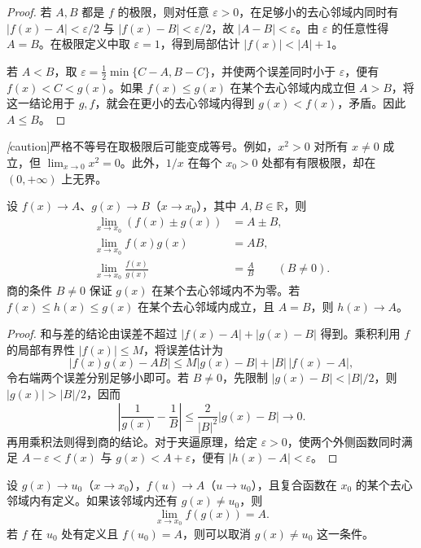 \documentclass[UTF8,12pt,a4paper,fontset=fandol]{ctexbook}
\begin{document}
\begin{proof}
若 $A,B$ 都是 $f$ 的极限，则对任意 $\varepsilon>0$，在足够小的去心邻域内同时有 $|f(x)-A|<\varepsilon/2$ 与 $|f(x)-B|<\varepsilon/2$，故 $|A-B|<\varepsilon$。由 $\varepsilon$ 的任意性得 $A=B$。在极限定义中取 $\varepsilon=1$，得到局部估计 $|f(x)|<|A|+1$。

若 $A<B$，取 $\varepsilon=\tfrac12\min\{C-A,B-C\}$，并使两个误差同时小于 $\varepsilon$，便有 $f(x)<C<g(x)$。如果 $f(x)\leq g(x)$ 在某个去心邻域内成立但 $A>B$，将这一结论用于 $g,f$，就会在更小的去心邻域内得到 $g(x)<f(x)$，矛盾。因此 $A\leq B$。
\end{proof}

\emph[caution]{严格不等号在取极限后可能变成等号。}例如，$x^2>0$ 对所有 $x\neq0$ 成立，但 $\lim_{x\to0}x^2=0$。此外，$1/x$ 在每个 $x_0>0$ 处都有有限极限，却在 $(0,+\infty)$ 上无界。

\begin{theorem}[四则运算与夹逼原理]
\label{thm:function-limit-arithmetic-and-squeeze}
设 $f(x)\to A$、$g(x)\to B$（$x\to x_0$），其中 $A,B\in\mathbb{R}$，则
\begin{equation}
    \begin{aligned}
        \lim_{x\to x_0}(f(x)\pm g(x))&=A\pm B,\\
        \lim_{x\to x_0}f(x)g(x)&=AB,\\
        \lim_{x\to x_0}\frac{f(x)}{g(x)}&=\frac AB\qquad(B\neq0).
    \end{aligned}
    \label{eq:function-limit-arithmetic}
\end{equation}
商的条件 $B\neq0$ 保证 $g(x)$ 在某个去心邻域内不为零。若 $f(x)\leq h(x)\leq g(x)$ 在某个去心邻域内成立，且 $A=B$，则 $h(x)\to A$。
\end{theorem}

\begin{proof}
和与差的结论由误差不超过 $|f(x)-A|+|g(x)-B|$ 得到。乘积利用 $f$ 的局部有界性 $|f(x)|\leq M$，将误差估计为
\[
    |f(x)g(x)-AB|\leq M|g(x)-B|+|B|\,|f(x)-A|,
\]
令右端两个误差分别足够小即可。若 $B\neq0$，先限制 $|g(x)-B|<|B|/2$，则 $|g(x)|>|B|/2$，因而
\[
    \left|\frac1{g(x)}-\frac1B\right|
    \leq\frac{2}{|B|^2}|g(x)-B|\to0.
\]
再用乘积法则得到商的结论。对于夹逼原理，给定 $\varepsilon>0$，使两个外侧函数同时满足 $A-\varepsilon<f(x)$ 与 $g(x)<A+\varepsilon$，便有 $|h(x)-A|<\varepsilon$。
\end{proof}

\begin{theorem}[复合函数的极限]
\label{thm:composition-of-function-limits}
设 $g(x)\to u_0$（$x\to x_0$），$f(u)\to A$（$u\to u_0$），且复合函数在 $x_0$ 的某个去心邻域内有定义。如果该邻域内还有 $g(x)\neq u_0$，则
\begin{equation}
    \lim_{x\to x_0}f(g(x))=A.
    \label{eq:composition-of-function-limits}
\end{equation}
若 $f$ 在 $u_0$ 处有定义且 $f(u_0)=A$，则可以取消 $g(x)\neq u_0$ 这一条件。
\end{theorem}
\end{document}
